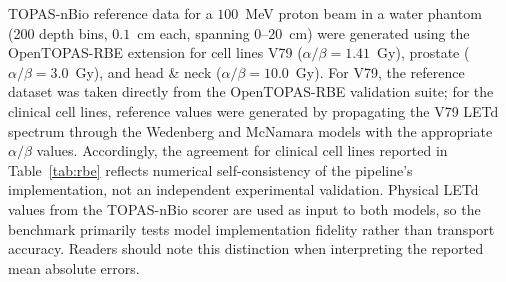 TOPAS-nBio reference data for a $100$~MeV proton beam in a water phantom
(200 depth bins, $0.1$~cm each, spanning $0$--$20$~cm) were generated
using the OpenTOPAS-RBE extension for cell lines V79
($\alpha/\beta = 1.41$~Gy), prostate ($\alpha/\beta = 3.0$~Gy),
and head \& neck ($\alpha/\beta = 10.0$~Gy).
For V79, the reference dataset was taken directly from the
OpenTOPAS-RBE validation suite; for the clinical cell lines,
reference values were generated by propagating the V79 LETd spectrum
through the Wedenberg and McNamara models with the appropriate
$\alpha/\beta$ values.
Accordingly, the agreement for clinical cell lines reported in
Table~\ref{tab:rbe} reflects numerical self-consistency of the pipeline's
implementation, not an independent experimental validation.
Physical LETd values from the TOPAS-nBio scorer are used as input
to both models, so the benchmark primarily tests model implementation
fidelity rather than transport accuracy.
Readers should note this distinction when interpreting the reported
mean absolute errors.
